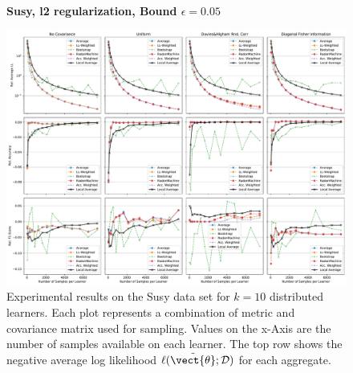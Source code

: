 \begin{landscape}
    \begin{figure}
        \centering
        \textbf{Susy, l2 regularization, Bound $\epsilon=0.05$}\par\medskip
        \includegraphics[height=\dimexpr \textheight - 1\baselineskip\relax]{kapitel/figures/susy_l2_0.05_neg_relative.pdf}
        \caption[Susy plots with l2 regularization and $\epsilon=0.05$]{Experimental results on the Susy data set for $k=10$ distributed learners. Each plot represents a combination of metric and covariance matrix used for sampling. Values on the x-Axis are the number of samples available on each learner. The top row shows the negative average log likelihood $\ell(\tilde{\vect{\theta}}; \mathcal{D})$ for each aggregate.}
        \label{fig:analysis1}
    \end{figure}
    \end{landscape}
